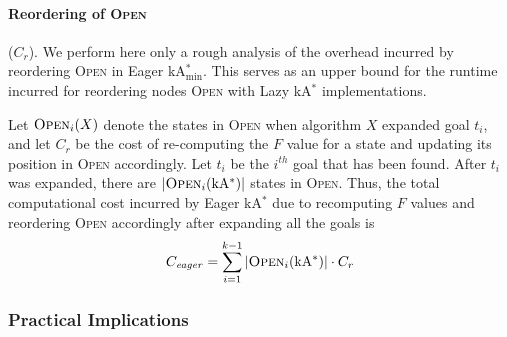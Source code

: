 \documentclass[smallextended]{svjour3}       %
\newcommand{\kastar}{kA$^*$\xspace}
\newcommand{\kastarvar}[1]{\textup{kA}$^*_{#1}$\xspace}
\newcommand{\kastarmin}{\kastarvar{\min}}
\newcommand{\open}{\textsc{Open}\xspace}
\begin{document}


\paragraph{Reordering of \open} ($C_r$).
We perform here only a rough analysis of the overhead incurred by reordering \open in Eager \kastarmin. This serves as an upper bound for the runtime incurred for reordering nodes \open with Lazy \kastar implementations. 

Let $\open_i(X)$ denote the states in \open when algorithm $X$ expanded goal $t_i$, and let $C_r$ be the cost of re-computing the $F$ value for a state and updating its position in \open accordingly. %
Let $t_i$ be the $i^{th}$ goal that has been found. 
After $t_i$ was expanded, there are $|\open_i(\text{\kastar})|$ states in \open. Thus, the total computational cost incurred by Eager \kastar due to recomputing $F$ values and reordering \open accordingly after expanding all the goals is
\begin{equation}
  C_{\mathit{eager}}=\sum_{i=1}^{k-1} |\open_i(\text{\kastar})| \cdot C_r
  \label{eq:re-sort-cost}
\end{equation}


\subsubsection{Practical Implications}
\end{document}

